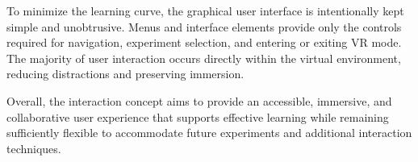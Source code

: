 To minimize the learning curve, the graphical user interface is intentionally kept simple and unobtrusive. Menus and interface elements provide only the controls required for navigation, experiment selection, and entering or exiting VR mode. The majority of user interaction occurs directly within the virtual environment, reducing distractions and preserving immersion.

Overall, the interaction concept aims to provide an accessible, immersive, and collaborative user experience that supports effective learning while remaining sufficiently flexible to accommodate future experiments and additional interaction techniques.